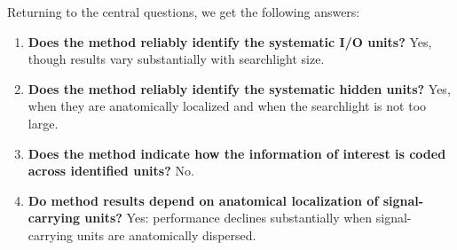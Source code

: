 Returning to the central questions, we get the following answers:

\begin{enumerate}
\item {\bf Does the method reliably identify the systematic I/O units?} Yes, though results vary substantially with searchlight size.
\item {\bf Does the method reliably identify the systematic hidden units?} Yes, when they are anatomically localized and when the searchlight is not too large.
\item {\bf Does the method indicate how the information of interest is coded across identified units?} No.
\item {\bf Do method results depend on anatomical localization of signal-carrying units?} Yes: performance declines substantially when signal-carrying units are anatomically dispersed.
\end{enumerate}
